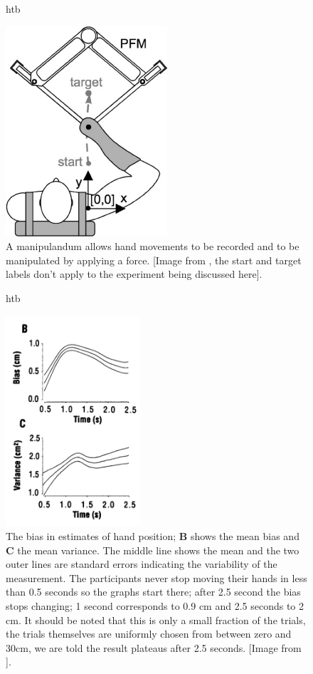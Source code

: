 \documentclass[12pt]{article}
\begin{document}
\begin{figure}{htb}
\begin{center}
  \includegraphics[width=6cm]{manipulandum.jpg}
\end{center}
\caption{A manipulandum allows hand movements to be recorded and to be
  manipulated by applying a force. [Image from \cite{MistryEt2013},
    the start and target labels don't apply to the experiment being
    discussed here].\label{fig_manipulandum}}
\end{figure}


\begin{figure}{htb}
\begin{center}
  \includegraphics[width=5cm]{fig_overestimate.png}
\end{center}
\caption{The bias in estimates of hand position; \textbf{B} shows the
  mean bias and \textbf{C} the mean variance. The middle line shows
  the mean and the two outer lines are standard errors indicating the
  variability of the measurement. The participants never stop moving
  their hands in less than 0.5 seconds so the graphs start there;
  after 2.5 second the bias stops changing; 1 second corresponds to
  0.9 cm and 2.5 seconds to 2 cm. It should be noted that this is only
  a small fraction of the trials, the trials themselves are uniformly
  chosen from between zero and 30cm, we are told the result plateaus after 2.5 seconds. [Image from
    \cite{WolpertEtAl1995}].\label{fig_overestimate}}
\end{figure}
\end{document}
